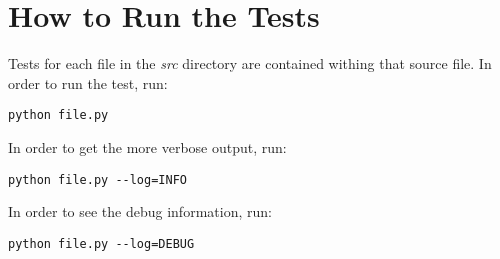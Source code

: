 \documentclass[main.tex]{subfiles}
\begin{document}
\chapter{How to Run the Tests}
\label{a_chap:source_code_overview}
Tests for each file in the \emph{src} directory are contained withing that
source file. In order to run the test, run:
\begin{verbatim}
python file.py
\end{verbatim}
In order to get the more verbose output, run:
\begin{verbatim}
python file.py --log=INFO
\end{verbatim}
In order to see the debug information, run:
\begin{verbatim}
python file.py --log=DEBUG
\end{verbatim}

\biblio
\end{document}
